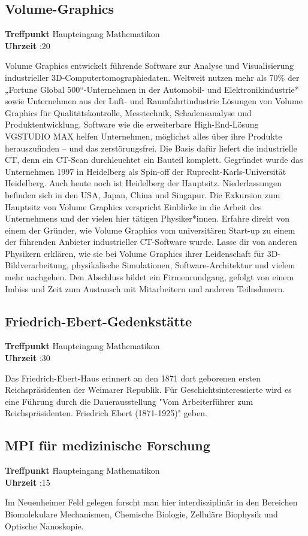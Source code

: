 \subsection*{Volume-Graphics}
\begin{tabbing}
\textbf{Treffpunkt} \quad \quad \quad \= Haupteingang Mathematikon\\
\textbf{Uhrzeit} :20
\end{tabbing}
Volume Graphics entwickelt führende Software zur Analyse und Visualisierung industrieller 3D-Computertomographiedaten. Weltweit nutzen mehr als 70\% der „Fortune Global 500“-Unternehmen in der Automobil- und Elektronikindustrie* sowie Unternehmen aus der Luft- und Raumfahrtindustrie Lösungen von Volume Graphics für Qualitätskontrolle, Messtechnik, Schadensanalyse und Produktentwicklung. Software wie die erweiterbare High-End-Lösung VGSTUDIO MAX helfen Unternehmen, möglichst alles über ihre Produkte herauszufinden – und das zerstörungsfrei. Die Basis dafür liefert die industrielle CT, denn ein CT-Scan durchleuchtet ein Bauteil komplett. Gegründet wurde das Unternehmen 1997 in Heidelberg als Spin-off der Ruprecht-Karls-Universität Heidelberg. Auch heute noch ist Heidelberg der Hauptsitz. Niederlassungen befinden sich in den USA, Japan, China und Singapur. Die Exkursion zum Hauptsitz von Volume Graphics verspricht Einblicke in die Arbeit des Unternehmens und der vielen hier tätigen Physiker*innen. Erfahre direkt von einem der Gründer, wie Volume Graphics vom universitären Start-up zu einem der führenden Anbieter industrieller CT-Software wurde. Lasse dir von anderen Physikern erklären, wie sie bei Volume Graphics ihrer Leidenschaft für 3D-Bildverarbeitung, physikalische Simulationen, Software-Architektur und vielem mehr nachgehen. Den Abschluss bildet ein Firmenrundgang, gefolgt von einem Imbiss und Zeit zum Austausch mit Mitarbeitern und anderen Teilnehmern. 

\subsection*{Friedrich-Ebert-Gedenkstätte}
\begin{tabbing}
\textbf{Treffpunkt} \quad \quad \quad \= Haupteingang Mathematikon\\
\textbf{Uhrzeit} :30
\end{tabbing}
Das Friedrich-Ebert-Haus erinnert an den 1871 dort geborenen ersten Reichspräsidenten der Weimarer Republik. Für Geschichtsinteressierte wird es eine Führung durch die Dauerausstellung "Vom Arbeiterführer zum Reichspräsidenten. Friedrich Ebert (1871-1925)" geben.

\subsection*{MPI für medizinische Forschung}
\begin{tabbing}
\textbf{Treffpunkt} \quad \quad \quad \= Haupteingang Mathematikon\\
\textbf{Uhrzeit} :15
\end{tabbing}
Im Neuenheimer Feld gelegen forscht man hier interdisziplinär in den Bereichen Biomolekulare Mechanismen, Chemische Biologie, Zelluläre Biophysik und Optische Nanoskopie. 